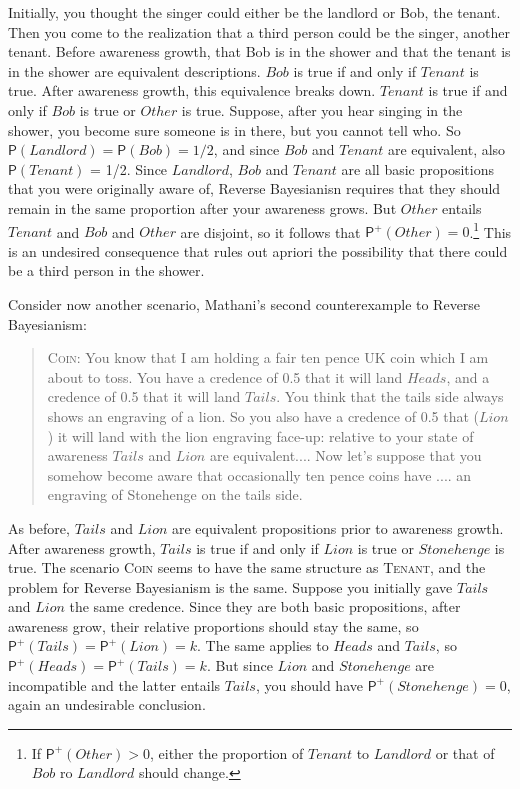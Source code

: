 \documentclass[
  11pt,
  dvipsnames,enabledeprecatedfontcommands]{scrartcl}
\newcommand{\ppr}[2]{\ensuremath{\mathsf{P}^{#1}(#2)}}
\begin{document}
\noindent Initially, you thought the singer could either be the landlord
or Bob, the tenant. Then you come to the realization that a third person
could be the singer, another tenant. Before awareness growth, that Bob
is in the shower and that the tenant is in the shower are equivalent
descriptions. \(Bob\) is true if and only if \(Tenant\) is true. After
awareness growth, this equivalence breaks down. \(Tenant\) is true if
and only if \(Bob\) is true or \(Other\) is true. Suppose, after you
hear singing in the shower, you become sure someone is in there, but you
cannot tell who. So \(\mathsf{P}(Landlord) = \mathsf{P}(Bob) = 1/2\),
and since \(Bob\) and \(Tenant\) are equivalent, also
\(\mathsf{P}(Tenant)\) = 1/2. Since \(Landlord\), \(Bob\) and \(Tenant\)
are all basic propositions that you were originally aware of, Reverse
Bayesianisn requires that they should remain in the same proportion
after your awareness grows. But \(Other\) entails \(Tenant\) and \(Bob\)
and \(Other\) are disjoint, so it follows that
\(\ppr{+}{Other} = 0\).\footnote{If \(\ppr{+}{Other} > 0\), either the
  proportion of \(Tenant\) to \(Landlord\) or that of \(Bob\) ro
  \(Landlord\) should change.} This is an undesired consequence that
rules out apriori the possibility that there could be a third person in
the shower.

Consider now another scenario, Mathani's second counterexample to
Reverse Bayesianism:

\begin{quote} 
\textsc{Coin}: You know that I am holding a fair ten pence UK coin which I am about to toss. You
have a credence of 0.5 that it will land $Heads$, and a credence of 0.5 that it will
land $Tails$. You think that the tails side always shows an engraving of a lion. So you
also  have a credence of 0.5 that ($Lion$) it will land with the lion engraving face-up: relative to your state of awareness $Tails$ and $Lion$ are equivalent.... Now let's suppose that you somehow become aware
that occasionally ten pence coins have .... an engraving of Stonehenge on the tails side. 
\end{quote}

\noindent  As before, \(Tails\) and \(Lion\) are equivalent propositions
prior to awareness growth. After awareness growth, \(Tails\) is true if
and only if \(Lion\) is true or \(Stonehenge\) is true. The scenario
\textsc{Coin} seems to have the same structure as \textsc{Tenant}, and
the problem for Reverse Bayesianism is the same. Suppose you initially
gave \(Tails\) and \(Lion\) the same credence. Since they are both basic
propositions, after awareness grow, their relative proportions should
stay the same, so \(\ppr{+}{Tails} = \ppr{+}{Lion} = k\). The same
applies to \(Heads\) and \(Tails\), so
\(\ppr{+}{Heads} = \ppr{+}{Tails} = k\). But since \(Lion\) and
\(Stonehenge\) are incompatible and the latter entails \(Tails\), you
should have \(\ppr{+}{Stonehenge} = 0\), again an undesirable
conclusion.
\end{document}
